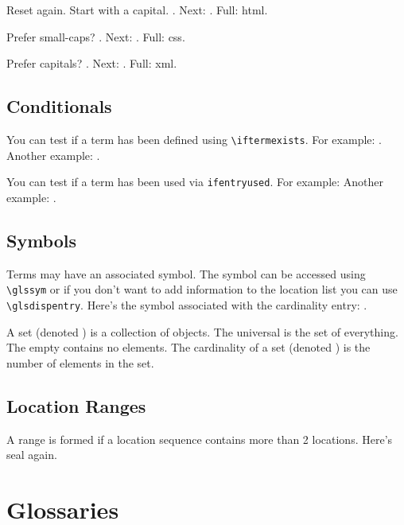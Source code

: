 \documentclass{book}
\begin{document}
Reset again. %
Start with a capital. .
Next: . Full: \Gls{html}.

Prefer small-caps?
\renewcommand{\acronymfont}[1]{\textsc{#1}}%
. Next: . Full: \gls{css}.

Prefer capitals?
\renewcommand{\acronymfont}[1]{\MakeTextUppercase{#1}}%
. Next: . Full: \gls{xml}.

\section{Conditionals}

You can test if a term has been defined using \verb|\iftermexists|.
For example: .
Another example: .

You can test if a term has been used via \verb|ifentryused|.
For example: 
Another example: .


\section{Symbols}

Terms may have an associated symbol. The symbol can be accessed
using \verb|\glssym| or if you don't want to add information to the
location list you can use \verb|\glsdispentry|. Here's the symbol
associated with the \gls{cardinality} entry:
.

A \gls{set} (denoted ) is a collection of objects.
The \gls{universal} is the set of everything.
The \gls{empty} contains no elements.
The \gls{cardinality} of a set (denoted ) is the
number of elements in the set.

\section{Location Ranges}

A range is formed if a location sequence contains more than 2
locations. Here's \gls{seal} again.

\backmatter
\setcounter{secnumdepth}{-1}

\chapter{Glossaries}
\end{document}
